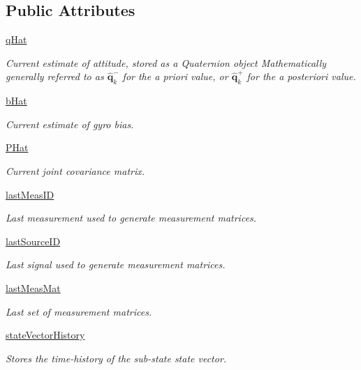 \subsection*{Public Attributes}
\begin{DoxyCompactItemize}
\item 
\hyperlink{classAttitudeSubstate_1_1AttitudeState6DOF_a36a58a47280151dd544762d9a1d5c35d}{q\+Hat}
\begin{DoxyCompactList}\small\item\em Current estimate of attitude, stored as a Quaternion object Mathematically generally referred to as $\mathbf{\hat{q}}^{-}_{k}$ for the a priori value, or $\mathbf{\hat{q}}^{+}_{k}$ for the a posteriori value. \end{DoxyCompactList}\item 
\hyperlink{classAttitudeSubstate_1_1AttitudeState6DOF_a1b8eff7c89a7a03875dc04263da7ec18}{b\+Hat}
\begin{DoxyCompactList}\small\item\em Current estimate of gyro bias. \end{DoxyCompactList}\item 
\hyperlink{classAttitudeSubstate_1_1AttitudeState6DOF_a6aac27efa4d5962865f7d3f701c919ab}{P\+Hat}
\begin{DoxyCompactList}\small\item\em Current joint covariance matrix. \end{DoxyCompactList}\item 
\hyperlink{classAttitudeSubstate_1_1AttitudeState6DOF_a1ea482e5536162f74876d1dd23b12e96}{last\+Meas\+ID}
\begin{DoxyCompactList}\small\item\em Last measurement used to generate measurement matrices. \end{DoxyCompactList}\item 
\hyperlink{classAttitudeSubstate_1_1AttitudeState6DOF_a0161cc024a651de854100014872165af}{last\+Source\+ID}
\begin{DoxyCompactList}\small\item\em Last signal used to generate measurement matrices. \end{DoxyCompactList}\item 
\hyperlink{classAttitudeSubstate_1_1AttitudeState6DOF_ae23a47fae330703aa8a50b207275c9b0}{last\+Meas\+Mat}
\begin{DoxyCompactList}\small\item\em Last set of measurement matrices. \end{DoxyCompactList}\item 
\hyperlink{classSubStates_1_1SubState_a24bf2de56fc3037d91cba43d28f3bf60}{state\+Vector\+History}
\begin{DoxyCompactList}\small\item\em Stores the time-\/history of the sub-\/state state vector. \end{DoxyCompactList}\end{DoxyCompactItemize}


